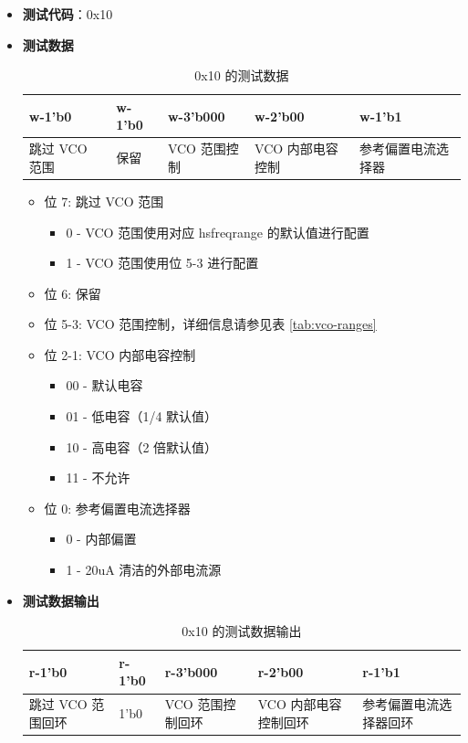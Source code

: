 \documentclass[main\_\_CN.tex]{subfiles}
\begin{document}
\begin{itemize}
    \item \textbf{测试代码}：0x10
    \item \textbf{测试数据}
        \begin{longtable}{ |p{3cm}|p{3cm}|p{3cm}|p{3cm}|p{3cm}|}
            \caption{0x10 的测试数据}
            \label{tab:test-data-0x10} \\
            \hline
            \rowcolor{lightgray}
            \textbf{w-1'b0} & \textbf{w-1'b0} & \textbf{w-3'b000} & \textbf{w-2'b00} & \textbf{w-1'b1} \\ \hline
            跳过 VCO 范围 & 保留 & VCO 范围控制 & VCO 内部电容控制 & 参考偏置电流选择器  \\ \hline
        \end{longtable}
        \begin{itemize}
            \item 位 7: 跳过 VCO 范围
                \begin{itemize}
                    \item 0 - VCO 范围使用对应 hsfreqrange 的默认值进行配置
                    \item 1 - VCO 范围使用位 5-3 进行配置
                \end{itemize}
            \item 位 6: 保留
            \item 位 5-3: VCO 范围控制，详细信息请参见表 \ref{tab:vco-ranges}
            \item 位 2-1: VCO 内部电容控制
                \begin{itemize}
                    \item 00 - 默认电容
                    \item 01 - 低电容（1/4 默认值）
                    \item 10 - 高电容（2 倍默认值）
                    \item 11 - 不允许
                \end{itemize}
            \item 位 0: 参考偏置电流选择器
                \begin{itemize}
                    \item 0 - 内部偏置
                    \item 1 -  20uA 清洁的外部电流源
                \end{itemize}
        \end{itemize}
    \item \textbf{测试数据输出}
        \begin{longtable}{ |p{3cm}|p{3cm}|p{3cm}|p{3cm}|p{3cm}|}
            \caption{0x10 的测试数据输出}
            \label{tab:test-dout-0x10} \\
            \hline
            \rowcolor{lightgray}
            \textbf{r-1'b0} & \textbf{r-1'b0} & \textbf{r-3'b000} & \textbf{r-2'b00} & \textbf{r-1'b1} \\ \hline
            跳过 VCO 范围回环 & 1'b0 & VCO 范围控制回环 & VCO 内部电容控制回环 & 参考偏置电流选择器回环  \\ \hline
        \end{longtable}
\end{itemize}
\end{document}
